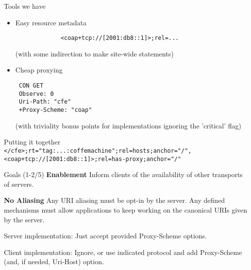\documentclass[aspectratio=169]{beamer}
\begin{document}
\begin{frame}[fragile]{Tools we have}\Large
	\begin{itemize}
		\item Easy resource metadata
			\begin{verbatim}
			 <coap+tcp://[2001:db8::1]>;rel=...
			\end{verbatim}%
			{\footnotesize (with some indirection to make site-wide statements)}
			\bigskip
		\item<2-> Cheap proxying

			\texttt{
			 CON GET\\
			~Observe: 0\\
			~Uri-Path: "cfe"\\
			}\color{darkgreen}\texttt{%
			+Proxy-Scheme: "coap"
			}
			\color{black}

			{\footnotesize (with triviality bonus points for implementations ignoring the 'critical' flag)}
	\end{itemize}
\end{frame}

\begin{frame}{Putting it together}
	\mbox{}\\
	\texttt{</cfe>;rt="tag:...:coffemachine"}{\color{gray}\texttt{;rel=hosts;anchor="/"}}\texttt{,}\\
	\texttt{<coap+tcp://[2001:db8::1]>;rel=}{\color{blue}\texttt{has-proxy}}{\color{gray}\texttt{;anchor="/"}}
	\begin{block}{Goals (1-2/5)}
		\textbf{Enablement} Inform clients of the availability of other transports of servers.

		\textbf{No Aliasing} Any URI aliasing must be opt-in by the server. Any defined mechanisms must allow applications to keep working on the canonical URIs given by the server.
	\end{block}

	\bigskip

	Server implementation: Just accept provided Proxy-Scheme options.

	\bigskip

	Client implementation: Ignore, or use indicated protocol and add Proxy-Scheme (and, if needed, Uri-Host) option.
\end{frame}
\end{document}

